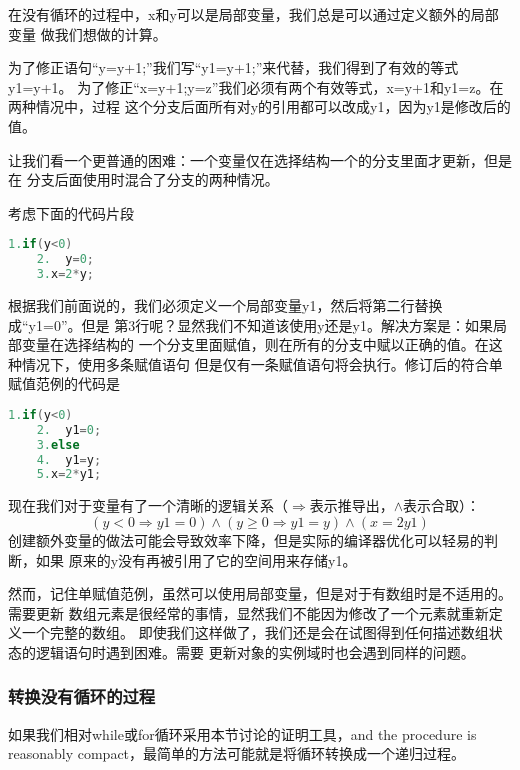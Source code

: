 在没有循环的过程中，x和y可以是局部变量，我们总是可以通过定义额外的局部变量
做我们想做的计算。

\begin{example}\mbox{}\par
为了修正语句“y=y+1;”我们写“y1=y+1;”来代替，我们得到了有效的等式y1=y+1。
为了修正“x=y+1;y=z”我们必须有两个有效等式，x=y+1和y1=z。在两种情况中，过程
这个分支后面所有对y的引用都可以改成y1，因为y1是修改后的值。
\end{example}

让我们看一个更普通的困难：一个变量仅在选择结构一个的分支里面才更新，但是在
分支后面使用时混合了分支的两种情况。

\begin{example}\mbox{}\par
考虑下面的代码片段

\begin{lstlisting}[language={Java}, keywordstyle=\color{blue!70}, commentstyle=\color{red!50!green!50!blue!50}]
    1.if(y<0)
    2.  y=0;
    3.x=2*y;
\end{lstlisting}

根据我们前面说的，我们必须定义一个局部变量y1，然后将第二行替换成“y1=0”。但是
第3行呢？显然我们不知道该使用y还是y1。解决方案是：如果局部变量在选择结构的
一个分支里面赋值，则在所有的分支中赋以正确的值。在这种情况下，使用多条赋值语句
但是仅有一条赋值语句将会执行。修订后的符合单赋值范例的代码是
\begin{lstlisting}[language={Java}, keywordstyle=\color{blue!70}, commentstyle=\color{red!50!green!50!blue!50}]
    1.if(y<0)
    2.  y1=0;
    3.else
    4.  y1=y;
    5.x=2*y1;
\end{lstlisting}
现在我们对于变量有了一个清晰的逻辑关系（$\Rightarrow$表示推导出，$\wedge$表示合取）：
\begin{displaymath}
(y<0 \Rightarrow y1=0) \wedge (y\geq 0 \Rightarrow y1 =y )\wedge (x =2y1)
\end{displaymath}
创建额外变量的做法可能会导致效率下降，但是实际的编译器优化可以轻易的判断，如果
原来的y没有再被引用了它的空间用来存储y1。
\end{example}

然而，记住单赋值范例，虽然可以使用局部变量，但是对于有数组时是不适用的。需要更新
数组元素是很经常的事情，显然我们不能因为修改了一个元素就重新定义一个完整的数组。
即使我们这样做了，我们还是会在试图得到任何描述数组状态的逻辑语句时遇到困难。需要
更新对象的实例域时也会遇到同样的问题。

\subsubsection{转换没有循环的过程}
如果我们相对while或for循环采用本节讨论的证明工具，and the procedure is reasonably
compact，最简单的方法可能就是将循环转换成一个递归过程。

